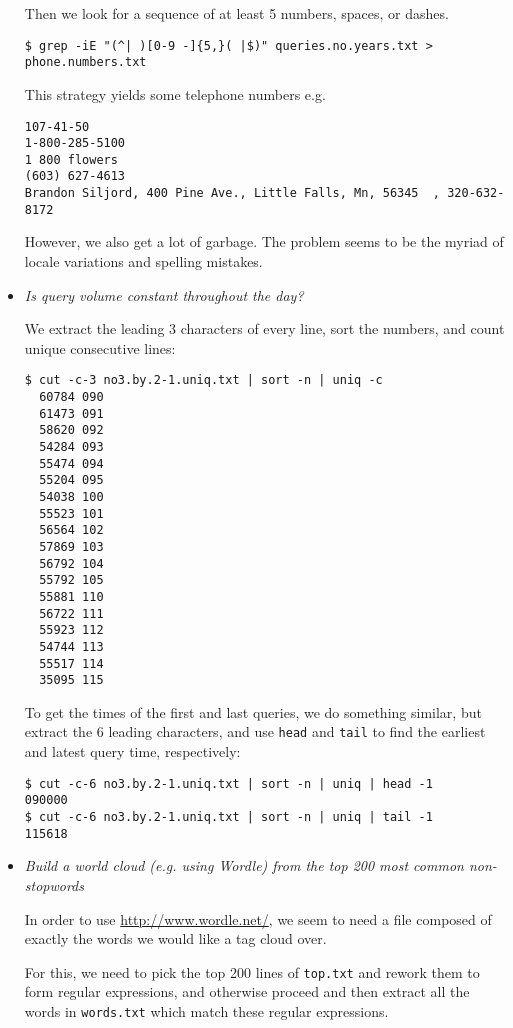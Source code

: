 \begin{itemize}
Then we look for a sequence of at least 5 numbers, spaces, or dashes.

\begin{lstlisting}
$ grep -iE "(^| )[0-9 -]{5,}( |$)" queries.no.years.txt > phone.numbers.txt
\end{lstlisting}

This strategy yields some telephone numbers e.g.

\begin{lstlisting}
107-41-50
1-800-285-5100
1 800 flowers
(603) 627-4613
Brandon Siljord, 400 Pine Ave., Little Falls, Mn, 56345  , 320-632-8172
\end{lstlisting}

However, we also get a lot of garbage. The problem seems to be the myriad of
locale variations and spelling mistakes.

\item \emph{Is query volume constant throughout the day?}

We extract the leading 3 characters of every line, sort the numbers, and count
unique consecutive lines:

\begin{lstlisting}
$ cut -c-3 no3.by.2-1.uniq.txt | sort -n | uniq -c
  60784 090
  61473 091
  58620 092
  54284 093
  55474 094
  55204 095
  54038 100
  55523 101
  56564 102
  57869 103
  56792 104
  55792 105
  55881 110
  56722 111
  55923 112
  54744 113
  55517 114
  35095 115
\end{lstlisting}

To get the times of the first and last queries, we do something similar, but
extract the 6 leading characters, and use \texttt{head} and \texttt{tail} to
find the earliest and latest query time, respectively:

\begin{lstlisting}
$ cut -c-6 no3.by.2-1.uniq.txt | sort -n | uniq | head -1
090000
$ cut -c-6 no3.by.2-1.uniq.txt | sort -n | uniq | tail -1
115618
\end{lstlisting}

\item \emph{Build a world cloud (e.g. using Wordle) from the top 200 most
common non-stopwords}

In order to use \url{http://www.wordle.net/}, we seem to need a file composed
of exactly the words we would like a tag cloud over. 

For this, we need to pick the top 200 lines of \texttt{top.txt} and rework them
to form regular expressions, and otherwise proceed and then extract all the
words in \texttt{words.txt} which match these regular expressions.


\end{itemize}
